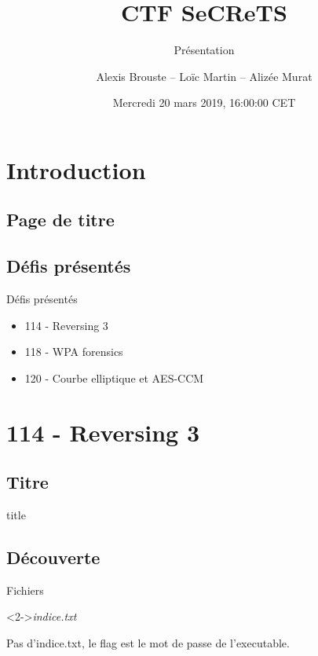 \documentclass[10pt,sans,usenames,dvipsnames,french,compress]{beamer}
\title{CTF SeCReTS}
\subtitle{Présentation}
\author{Alexis Brouste -- Loïc Martin -- Alizée Murat}
\date{Mercredi 20 mars 2019, 16:00:00 CET}
\institute[UVSQ]{UVSQ}
\begin{document}
\section{Introduction}
\subsection{Page de titre}
\begin{frame}[plain]
	\titlepage
\end{frame}

\subsection{Défis présentés}
\begin{frame}{Défis présentés}
	\begin{itemize}
		\item 114 - Reversing 3
		\item 118 - WPA forensics
		\item 120 - Courbe elliptique et AES-CCM
	\end{itemize}
\end{frame}

\section{114 - Reversing 3}
\subsection{Titre}
\begin{frame}
	\begin{beamercolorbox}[sep=8pt,center]{title}
	\end{beamercolorbox}
\end{frame}

\subsection{Découverte}
\begin{frame}
	\begin{block}{Fichiers}
		\begin{small}
		\end{small}
	\end{block}

	\begin{block}<2->{\textit{indice.txt}}
		\begin{itshape}	
			\begin{small}
			Pas d'indice.txt, le flag est le mot de passe de l'executable.
			\end{small}
		\end{itshape}
	\end{block}
\end{frame}
\end{document}
